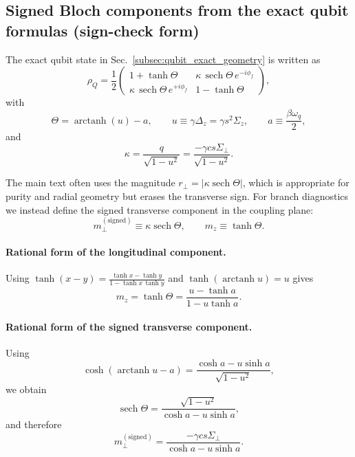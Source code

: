 \subsection{Signed Bloch components from the exact qubit formulas (sign-check form)}

The exact qubit state in Sec.~\ref{subsec:qubit_exact_geometry} is written as
\begin{equation}
    \rho_Q = \frac{1}{2}
    \begin{pmatrix}
        1+\tanh\Theta & \kappa \,\operatorname{sech}\Theta\,e^{-i\phi_f}\\
        \kappa \,\operatorname{sech}\Theta\,e^{+i\phi_f} & 1-\tanh\Theta
    \end{pmatrix},
\end{equation}
with
\begin{equation}
    \Theta = \operatorname{arctanh}(u)-a,
    \qquad
    u \equiv \gamma \Delta_z = \gamma s^2\Sigma_z,
    \qquad
    a \equiv \frac{\beta\omega_q}{2},
\end{equation}
and
\begin{equation}
    \kappa = \frac{q}{\sqrt{1-u^2}}
    = \frac{-\gamma c s \Sigma_\perp}{\sqrt{1-u^2}}.
\end{equation}

The main text often uses the magnitude
$r_\perp = |\kappa\operatorname{sech}\Theta|$, which is appropriate for purity
and radial geometry but erases the transverse sign.  For branch diagnostics we
instead define the signed transverse component in the coupling plane:
\begin{equation}
    m_\perp^{(\mathrm{signed})} \equiv \kappa\operatorname{sech}\Theta,
    \qquad
    m_z \equiv \tanh\Theta .
\end{equation}

\paragraph{Rational form of the longitudinal component.}
Using $\tanh(x-y)=\frac{\tanh x-\tanh y}{1-\tanh x\,\tanh y}$ and
$\tanh(\operatorname{arctanh}u)=u$ gives
\begin{equation}
    m_z = \tanh\Theta
    = \frac{u-\tanh a}{1-u\tanh a}.
    \label{eq:branch_codex_mz_rational}
\end{equation}

\paragraph{Rational form of the signed transverse component.}
Using
\begin{equation}
    \cosh(\operatorname{arctanh}u-a)
    = \frac{\cosh a - u \sinh a}{\sqrt{1-u^2}},
\end{equation}
we obtain
\begin{equation}
    \operatorname{sech}\Theta
    = \frac{\sqrt{1-u^2}}{\cosh a - u \sinh a},
\end{equation}
and therefore
\begin{equation}
    m_\perp^{(\mathrm{signed})}
    = \frac{-\gamma c s \Sigma_\perp}{\cosh a - u \sinh a}.
    \label{eq:branch_codex_mperp_rational}
\end{equation}

